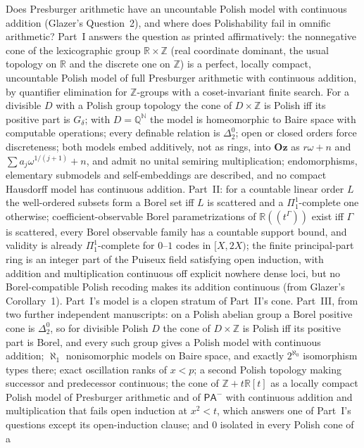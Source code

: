\documentclass[11pt]{article}
\newcommand{\Q}{\mathbb{Q}}
\newcommand{\R}{\mathbb{R}}
\newcommand{\N}{\mathbb{N}}
\newcommand{\Oz}{\mathbf{Oz}}
\newcommand{\Z}{\mathbb{Z}}
\begin{document}
{Does Presburger arithmetic have an uncountable Polish model with
continuous addition (Glazer's Question~2), and where does Polishability
fail in omnific arithmetic?  Part~I answers the question as printed
affirmatively: the nonnegative cone of the lexicographic group
$\R\times\Z$ (real coordinate dominant, the usual topology on $\R$ and the
discrete one on $\Z$) is a perfect, locally compact, uncountable Polish
model of full Presburger arithmetic with continuous addition, by
quantifier elimination for $\Z$-groups with a coset-invariant finite
search.  For a divisible $D$ with a Polish group topology the cone of
$D\times\Z$ is Polish iff its positive part is $G_\delta$; with $D=\Q^{\N}$
the model is homeomorphic to Baire space with computable operations; every
definable relation is $\Delta^0_2$; open or closed orders force
discreteness; both models embed additively, not as rings, into $\Oz$ as
$r\omega+n$ and $\sum a_j\omega^{1/(j+1)}+n$, and admit no unital semiring
multiplication; endomorphisms, elementary submodels and self-embeddings
are described, and no compact Hausdorff model has continuous addition.
Part~II: for a countable linear order $L$ the well-ordered subsets form a
Borel set iff $L$ is scattered and a $\Pi^1_1$-complete one otherwise;
coefficient-observable Borel parametrizations of $\R((t^\Gamma))$ exist iff
$\Gamma$ is scattered, every Borel observable family has a countable
support bound, and validity is already $\Pi^1_1$-complete for $0$--$1$
codes in $[X,2X)$; the finite principal-part ring is an integer part of
the Puiseux field satisfying open induction, with addition and
multiplication continuous off explicit nowhere dense loci, but no
Borel-compatible Polish recoding makes its addition continuous (from
Glazer's Corollary~1).  Part~I's model is a clopen stratum of Part~II's
cone.  Part~III, from two further independent manuscripts: on a Polish
abelian group a Borel positive cone is $\Delta^0_2$, so for divisible Polish
$D$ the cone of $D\times\Z$ is Polish iff its positive part is Borel, and
every such group gives a Polish model with continuous addition;
$\aleph_1$ nonisomorphic models on Baire space, and exactly $2^{\aleph_0}$
isomorphism types there; exact oscillation ranks of $x<p$; a second Polish
topology making successor and predecessor continuous; the cone of
$\Z+t\R[t]$ as a locally compact Polish model of Presburger arithmetic and
of $\mathsf{PA}^-$ with continuous addition and multiplication that fails
open induction at $x^2<t$, which answers one of Part~I's questions except
its open-induction clause; and $0$ isolated in every Polish cone of a
}
\end{document}
